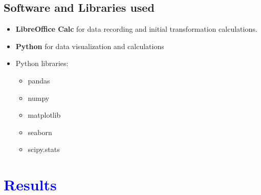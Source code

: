 \documentclass[10pt,a4paper]{article}
\begin{document}
					\subsection{Software and Libraries used}
					\begin{itemize}
						\item \textbf{LibreOffice Calc} for data recording and initial transformation calculations.
						\item \textbf{Python} for data visualization and calculations
						\item Python libraries:
						\begin{itemize}
							\item pandas
							\item numpy
							\item matplotlib
							\item seaborn
							\item scipy.stats
						\end{itemize}
					\end{itemize}		
					
				\section{\textcolor{blue}{Results}}
\end{document}
